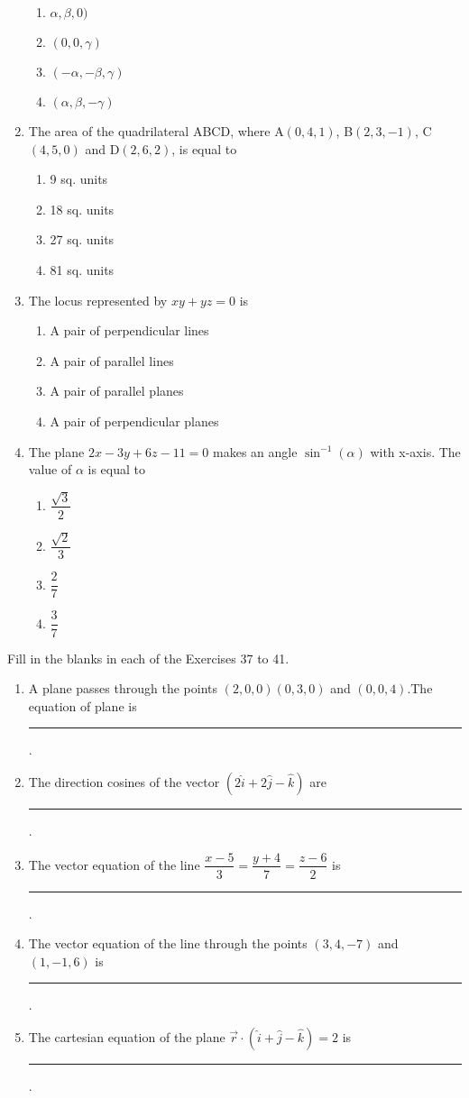 \documentclass[12pt]{article}
\begin{document}
\begin{enumerate}[resume]
\begin{enumerate}[fourcol]
	\item $\alpha,\beta,0)$
	\item $(0,0,\gamma)$
	\item $(-\alpha,-\beta,\gamma)$
	\item $(\alpha,\beta,-\gamma)$
\end{enumerate}
\item The area of the quadrilateral ABCD, where A$(0,4,1)$, B$(2,3,-1)$, C$(4,5,0)$ and D$(2,6,2)$, is equal to 
\begin{enumerate}[fourcol]
	\item 9 sq. units
	\item 18 sq. units 
	\item 27 sq. units 
	\item 81 sq. units
\end{enumerate}
\item The locus represented by $xy+yz=0$ is 
\begin{enumerate}[twocol]
	\item A pair of perpendicular lines
	\item A pair of parallel lines
	\item A pair of parallel planes 
	\item A pair of perpendicular planes
\end{enumerate}
\item The plane $2x-3y+6z-11=0$ makes an angle $\sin^{-1}(\alpha)$ with x-axis. The value of $\alpha$ is equal to 
\begin{enumerate}[fourcol]
	\item  $\dfrac{\sqrt{3}}{2}$
	\item  $\dfrac{\sqrt{2}}{3}$
	\item  $\dfrac{2}{7}$
	\item  $\dfrac{3}{7}$
\end{enumerate}
\end{enumerate}
Fill in the blanks in each of the Exercises 37 to 41.
\begin{enumerate}[resume]
\item A plane passes through the points $(2,0,0) (0,3,0)$ and $(0,0,4)$.The equation of plane is \noindent\rule{2cm}{0.4pt}.
\item The direction cosines of the vector $(2\hat{i}+2\hat{j}-\hat{k})$ are \noindent\rule{2cm}{0.4pt}.
\item The vector equation of the line $\dfrac{x-5}{3}=\dfrac{y+4}{7}=\dfrac{z-6}{2}$ is \noindent\rule{2cm}{0.4pt}. 
\item The vector equation of the line through the points $(3,4,-7)$ and $(1,-1,6)$ is \noindent\rule{2cm}{0.4pt}.
\item The cartesian equation of the plane $\overrightarrow{r} \cdot (\hat{i}+\hat{j}-\hat{k})=2$ is \noindent\rule{2cm}{0.4pt}.
\end{enumerate}
\end{document}
